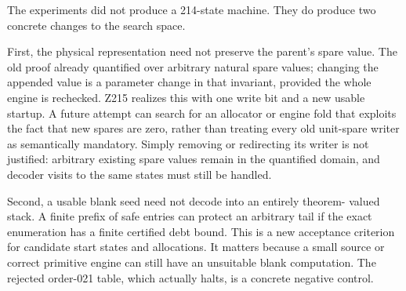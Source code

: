 \documentclass[11pt,letterpaper]{article}
\theoremstyle{definition}
\begin{document}
The experiments did not produce a 214-state machine.  They do produce
two concrete changes to the search space.

First, the physical representation need not preserve the parent's spare
value.  The old proof already quantified over arbitrary natural spare
values; changing the appended value is a parameter change in that
invariant, provided the whole engine is rechecked.  Z215 realizes this
with one write bit and a new usable startup.  A future attempt can
search for an allocator or engine fold that exploits the fact that
new spares are zero, rather than treating every old unit-spare writer
as semantically mandatory.  Simply removing or redirecting its writer
is not justified: arbitrary existing spare values remain in the
quantified domain, and decoder visits to the same states must still be
handled.

Second, a usable blank seed need not decode into an entirely theorem-
valued stack.  A finite prefix of safe entries can protect an arbitrary
tail if the exact enumeration has a finite certified debt bound.
This is a new acceptance criterion for candidate start states and
allocations.  It matters because a small source or correct primitive
engine can still have an unsuitable blank computation.  The rejected
order-021 table, which actually halts, is a concrete negative control.
\end{document}

